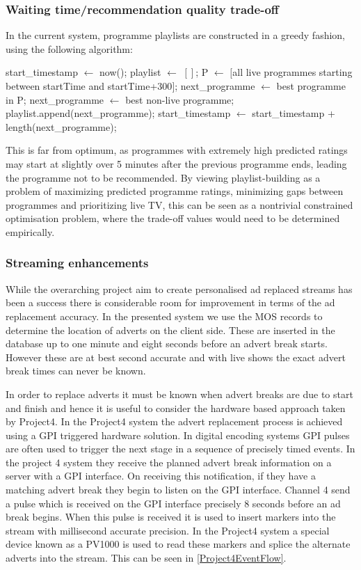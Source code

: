 	\subsubsection{Waiting time/recommendation quality trade-off}
	In the current system, programme playlists are constructed in a greedy fashion, using the following algorithm:
	\begin{algorithmic}[H]
	\State start\_timestamp $\gets$ now();
	\State playlist $\gets$ $[]$;
		\State P $\gets$ $[$all live programmes starting between startTime and startTime+300$]$;
			\State next\_programme $\gets$ best programme in P;
		\Else
			\State next\_programme $\gets$ best non-live programme;
		\EndIf
		\State playlist.append(next\_programme);
		\State start\_timestamp $\gets$ start\_timestamp + length(next\_programme);
	\EndWhile
	\end{algorithmic}
	This is far from optimum, as programmes with extremely high predicted ratings may start at slightly over 5 minutes after the previous programme ends, leading the programme not to be recommended. By viewing playlist-building as a problem of maximizing predicted programme ratings, minimizing gaps between programmes and prioritizing live TV, this can be seen as a nontrivial constrained optimisation problem, where the trade-off values would need to be determined empirically.

	\subsubsection{Streaming enhancements}
	While the overarching project aim to create personalised ad replaced streams has been a success there is considerable room for improvement in terms of the ad replacement accuracy. In the presented system we use the MOS records to determine the location of adverts on the client side. These are inserted in the database up to one minute and eight seconds before an advert break starts. However these are at best second accurate and with live shows the exact advert break times can never be known.

	In order to replace adverts it must be known when advert breaks are due to start and finish and hence it is useful to consider the hardware based approach taken by Project4. In the Project4 system the advert replacement process is achieved using a GPI\citep{SCTE104} triggered hardware solution. In digital encoding systems GPI pulses are often used to trigger the next stage in a sequence of precisely timed events. In the project 4 system they receive the planned advert break information on a server with a GPI interface. On receiving this notification, if they have a matching advert break they begin to listen on the GPI interface. Channel 4 send a pulse which is received on the GPI interface precisely 8 seconds before an ad break begins. When this pulse is received it is used to insert markers into the stream with millisecond accurate precision. In the Project4 system a special device known as a PV1000 is used to read these markers and splice the alternate adverts into the stream. This can be seen in \ref{Project4EventFlow}.
	
